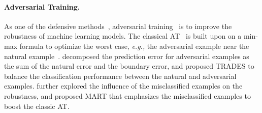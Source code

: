 \documentclass{article} %
\theoremstyle{plain}
\theoremstyle{definition}
\theoremstyle{remark}
\begin{document}

\paragraph{Adversarial Training.}
As one of the defensive methods~\citep{papernot2016distillation}, adversarial training~\citep{Madry_adversarial_training} is to improve the robustness of machine learning models. The classical AT~\citep{Madry_adversarial_training} is built upon on a min-max formula to optimize the worst case, \textit{e.g.,} the adversarial example near the natural example~\citep{Goodfellow14_Adversarial_examples}. \citet{Zhang_trades} decomposed the prediction error for adversarial examples as the sum of the natural error and the boundary error, and proposed TRADES to balance the classification performance between the natural and adversarial examples. \citet{wang2020improving_MART} further explored the influence of the misclassified examples on the robustness, and proposed MART that emphasizes the misclassified examples to boost the classic AT. 
\end{document}
